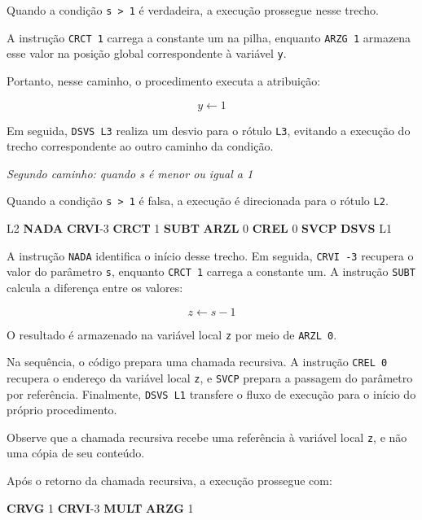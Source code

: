 \documentclass[
  brazilian,
  letterpaper,
]{book}
\newenvironment{Shaded}{\begin{snugshade}}{\end{snugshade}}
\newcommand{\DecValTok}[1]{\textcolor[rgb]{0.68,0.00,0.00}{#1}}
\newcommand{\FunctionTok}[1]{\textcolor[rgb]{0.28,0.35,0.67}{#1}}
\newcommand{\KeywordTok}[1]{\textcolor[rgb]{0.00,0.23,0.31}{\textbf{#1}}}
\newcommand{\NormalTok}[1]{\textcolor[rgb]{0.00,0.23,0.31}{#1}}
\theoremstyle{plain}
\theoremstyle{definition}
\theoremstyle{remark}
\begin{document}
Quando a condição \texttt{s\ \textgreater{}\ 1} é verdadeira, a execução
prossegue nesse trecho.

A instrução \texttt{CRCT\ 1} carrega a constante um na pilha, enquanto
\texttt{ARZG\ 1} armazena esse valor na posição global correspondente à
variável \texttt{y}.

Portanto, nesse caminho, o procedimento executa a atribuição:

\[ y \leftarrow 1 \]

Em seguida, \texttt{DSVS\ L3} realiza um desvio para o rótulo
\texttt{L3}, evitando a execução do trecho correspondente ao outro
caminho da condição.

\emph{Segundo caminho: quando s é menor ou igual a 1}

Quando a condição \texttt{s\ \textgreater{}\ 1} é falsa, a execução é
direcionada para o rótulo \texttt{L2}.

\begin{Shaded}
\begin{Highlighting}[]
\FunctionTok{L2}  \KeywordTok{NADA}
    \KeywordTok{CRVI}\NormalTok{    {-}}\DecValTok{3}
    \KeywordTok{CRCT}    \DecValTok{1}
    \KeywordTok{SUBT}
    \KeywordTok{ARZL}    \DecValTok{0}
    \KeywordTok{CREL}    \DecValTok{0}
    \KeywordTok{SVCP}
    \KeywordTok{DSVS}    \FunctionTok{L1}
\end{Highlighting}
\end{Shaded}

A instrução \texttt{NADA} identifica o início desse trecho. Em seguida,
\texttt{CRVI\ -3} recupera o valor do parâmetro \texttt{s}, enquanto
\texttt{CRCT\ 1} carrega a constante um. A instrução \texttt{SUBT}
calcula a diferença entre os valores:

\[ z \leftarrow s-1 \]

O resultado é armazenado na variável local \texttt{z} por meio de
\texttt{ARZL\ 0}.

Na sequência, o código prepara uma chamada recursiva. A instrução
\texttt{CREL\ 0} recupera o endereço da variável local \texttt{z}, e
\texttt{SVCP} prepara a passagem do parâmetro por referência.
Finalmente, \texttt{DSVS\ L1} transfere o fluxo de execução para o
início do próprio procedimento.

Observe que a chamada recursiva recebe uma referência à variável local
\texttt{z}, e não uma cópia de seu conteúdo.

Após o retorno da chamada recursiva, a execução prossegue com:

\begin{Shaded}
\begin{Highlighting}[]
    \KeywordTok{CRVG}    \DecValTok{1}
    \KeywordTok{CRVI}\NormalTok{    {-}}\DecValTok{3}
    \KeywordTok{MULT}
    \KeywordTok{ARZG}    \DecValTok{1}
\end{Highlighting}
\end{Shaded}
\end{document}
